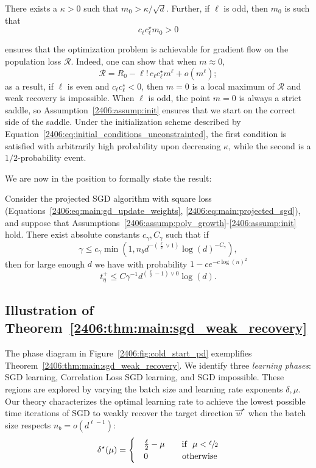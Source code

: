 \begin{assumption}[Initialization]\label{2406:assump:init}
    There exists a $\kappa > 0$ such that $m_0 > \kappa / \sqrt{d}$. Further, if $\ell$ is odd, then $m_0$ is such that
    \[ c_\ell c_\ell^\star m_0 > 0 \]
\end{assumption}
 ensures that the optimization problem is achievable for gradient flow on the population loss $\mathcal{R}$. Indeed, one can show that when $m \approx 0$,
\[ \mathcal{R} = R_0 - \ell!\, c_\ell c_\ell^\star m^\ell + o(m^\ell); \]
as a result, if $\ell$ is even and $c_\ell c_\ell^\star < 0$, then $m = 0$ is a local maximum of $\mathcal{R}$ and weak recovery is impossible. When $\ell$ is odd, the point $m=0$ is always a strict saddle, so Assumption~\ref{2406:assump:init} ensures that we start on the correct side of the saddle. Under the initialization scheme described by Equation~\ref{2406:eq:initial_conditions_unconstrainted}, the first condition is satisfied with arbitrarily high probability upon decreasing $\kappa$, while the second is a $1/2$-probability event.

We are now in the position to formally state the result:
\begin{theorem} 
\label{2406:thm:main:sgd_weak_recovery}
   Consider the projected SGD algorithm with square loss  (Equations~\eqref{2406:eq:main:gd_update_weights}, \eqref{2406:eq:main:projected_sgd}), and suppose that Assumptions~\ref{2406:assump:poly_growth}-\ref{2406:assump:init} hold. There exist absolute constants $c_\gamma, C_\gamma$ such that if
   \[ \gamma\leq c_\gamma \min\left(1, n_b d^{-\left(\frac\ell2\vee 1\right)} \log(d)^{-C_\gamma}\right), \]
    then for large enough $d$ we have with probability $1-ce^{-c\log(n)^2}$
   \begin{equation}
       t_\eta^+ \leq C\gamma^{-1}d^{\left(\frac{\ell}2 - 1 \right) \vee 0}\log(d).
   \end{equation}
\end{theorem}



 
 \subsection{Illustration of Theorem~\ref{2406:thm:main:sgd_weak_recovery}} The phase diagram in Figure~\ref{2406:fig:cold_start_pd} exemplifies Theorem~\ref{2406:thm:main:sgd_weak_recovery}. We identify three \textit{learning phases}: SGD learning, Correlation Loss SGD learning, and SGD impossible. These regions are explored by varying the batch size and learning rate exponents $\delta,\mu$. Our theory characterizes the optimal learning rate to achieve the lowest possible time iterations of SGD to weakly recover the target direction $\vec w^\star$ when the batch size respects $n_b = o(d^{\ell -1})$:
 \begin{align}
     \delta^\star(\mu) = 
     \begin{cases}
         &\frac{\ell}{2} - \mu  \qquad \text{if} ~ ~ \mu< \sfrac{\ell}{2} \\
         & 0 \qquad \qquad \text{otherwise} 
     \end{cases}
 \end{align}
 
